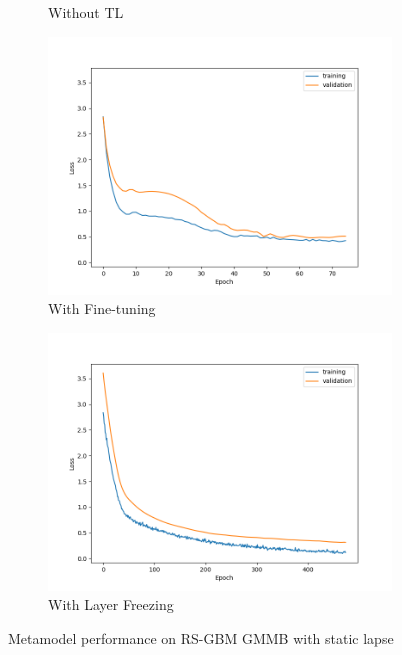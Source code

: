 \begin{figure}[ht!]
\begin{subfigure}{0.48\textwidth}
        \caption{Without TL}
        \label{subfig3-1:without}
    \end{subfigure}
    \begin{subfigure}{0.48\textwidth}
        \includegraphics[width=\textwidth]{./project3/figures/figure1c.png}
        \caption{With Fine-tuning}
        \label{subfig3-1:fineTuning}
    \end{subfigure}\hfill
    \begin{subfigure}{0.48\textwidth}
        \includegraphics[width=\textwidth]{./project3/figures/figure1d.png}
        \caption{With Layer Freezing}
        \label{subfig3-1:layerFreezing}
    \end{subfigure}
    \caption{Metamodel performance on RS-GBM GMMB with static lapse}
    \label{fig3:figure1}
\end{figure}

